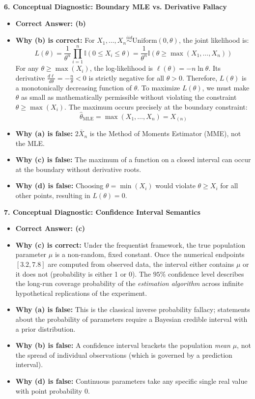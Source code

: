 \textbf{6. Conceptual Diagnostic: Boundary MLE vs. Derivative Fallacy}
\begin{itemize}
    \item \textbf{Correct Answer: (b)}
    \item \textbf{Why (b) is correct:} For $X_1, \dots, X_n \stackrel{iid}{\sim} \text{Uniform}(0, \theta)$, the joint likelihood is:
    $$L(\theta) = \frac{1}{\theta^n} \prod_{i=1}^n \mathbb{I}(0 \le X_i \le \theta) = \frac{1}{\theta^n} \mathbb{I}(\theta \ge \max(X_1, \dots, X_n))$$
    For any $\theta \ge \max(X_i)$, the log-likelihood is $\ell(\theta) = -n \ln \theta$. Its derivative $\frac{d\ell}{d\theta} = -\frac{n}{\theta} < 0$ is strictly negative for all $\theta > 0$. Therefore, $L(\theta)$ is a monotonically decreasing function of $\theta$. To maximize $L(\theta)$, we must make $\theta$ as small as mathematically permissible without violating the constraint $\theta \ge \max(X_i)$.
    The maximum occurs precisely at the boundary constraint:
    $$\hat{\theta}_{\text{MLE}} = \max(X_1, \dots, X_n) = X_{(n)}$$
    \item \textbf{Why (a) is false:} $2\bar{X}_n$ is the Method of Moments Estimator (MME), not the MLE.
    \item \textbf{Why (c) is false:} The maximum of a function on a closed interval can occur at the boundary without derivative roots.
    \item \textbf{Why (d) is false:} Choosing $\theta = \min(X_i)$ would violate $\theta \ge X_i$ for all other points, resulting in $L(\theta) = 0$.
\end{itemize}

\textbf{7. Conceptual Diagnostic: Confidence Interval Semantics}
\begin{itemize}
    \item \textbf{Correct Answer: (c)}
    \item \textbf{Why (c) is correct:} Under the frequentist framework, the true population parameter $\mu$ is a non-random, fixed constant. Once the numerical endpoints $[3.2, 7.8]$ are computed from observed data, the interval either contains $\mu$ or it does not (probability is either 1 or 0). 
    The $95\%$ confidence level describes the long-run coverage probability of the \emph{estimation algorithm} across infinite hypothetical replications of the experiment.
    \item \textbf{Why (a) is false:} This is the classical inverse probability fallacy; statements about the probability of parameters require a Bayesian credible interval with a prior distribution.
    \item \textbf{Why (b) is false:} A confidence interval brackets the population \emph{mean} $\mu$, not the spread of individual observations (which is governed by a prediction interval).
    \item \textbf{Why (d) is false:} Continuous parameters take any specific single real value with point probability 0.
\end{itemize}

